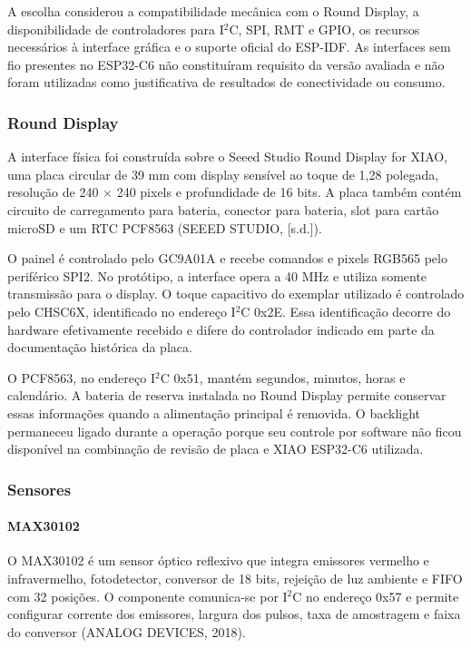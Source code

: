 \documentclass[a4paper,12pt]{article}
\begin{document}
A escolha considerou a compatibilidade mec\^anica com o Round Display, a disponibilidade de controladores para I$^2$C, SPI, RMT e GPIO, os recursos necess\'arios \`a interface gr\'afica e o suporte oficial do ESP-IDF. As interfaces sem fio presentes no ESP32-C6 n\~ao constitu\'iram requisito da vers\~ao avaliada e n\~ao foram utilizadas como justificativa de resultados de conectividade ou consumo.


\subsubsection{Round Display}


A interface f\'isica foi constru\'ida sobre o Seeed Studio Round Display for XIAO, uma placa circular de 39 mm com display sens\'ivel ao toque de 1,28 polegada, resolu\c{c}\~ao de 240 $\times$ 240 pixels e profundidade de 16 bits. A placa tamb\'em cont\'em circuito de carregamento para bateria, conector para bateria, slot para cart\~ao microSD e um RTC PCF8563 (SEEED STUDIO, [s.d.]).


O painel \'e controlado pelo GC9A01A e recebe comandos e pixels RGB565 pelo perif\'erico SPI2. No prot\'otipo, a interface opera a 40 MHz e utiliza somente transmiss\~ao para o display. O toque capacitivo do exemplar utilizado \'e controlado pelo CHSC6X, identificado no endere\c{c}o I$^2$C 0x2E. Essa identifica\c{c}\~ao decorre do hardware efetivamente recebido e difere do controlador indicado em parte da documenta\c{c}\~ao hist\'orica da placa.


O PCF8563, no endere\c{c}o I$^2$C 0x51, mant\'em segundos, minutos, horas e calend\'ario. A bateria de reserva instalada no Round Display permite conservar essas informa\c{c}\~oes quando a alimenta\c{c}\~ao principal \'e removida. O backlight permaneceu ligado durante a opera\c{c}\~ao porque seu controle por software n\~ao ficou dispon\'ivel na combina\c{c}\~ao de revis\~ao de placa e XIAO ESP32-C6 utilizada.


\subsubsection{Sensores}


\paragraph{MAX30102}


O MAX30102 \'e um sensor \'optico reflexivo que integra emissores vermelho e infravermelho, fotodetector, conversor de 18 bits, rejei\c{c}\~ao de luz ambiente e FIFO com 32 posi\c{c}\~oes. O componente comunica-se por I$^2$C no endere\c{c}o 0x57 e permite configurar corrente dos emissores, largura dos pulsos, taxa de amostragem e faixa do conversor (ANALOG DEVICES, 2018).
\end{document}
